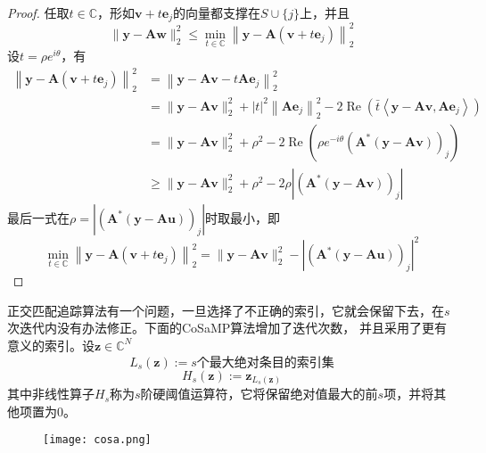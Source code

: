 \begin{proof}
任取$t \in \mathbb{C}$，形如$\mathbf{v}+t \mathbf{e}_j$的向量都支撑在$S \cup\{j\}$上，并且
\begin{equation}
    \|\mathbf{y}-\mathbf{A} \mathbf{w}\|_2^2 \leq \min _{t \in \mathbb{C}}\left\|\mathbf{y}-\mathbf{A}\left(\mathbf{v}+t \mathbf{e}_j\right)\right\|_2^2
\end{equation}
设$t=\rho e^{i \theta}$，有
\begin{equation}
    \begin{aligned}
    \left\|\mathbf{y}-\mathbf{A}\left(\mathbf{v}+t \mathbf{e}_j\right)\right\|_2^2 & =\left\|\mathbf{y}-\mathbf{A v}-t \mathbf{A} \mathbf{e}_j\right\|_2^2 \\
    & =\|\mathbf{y}-\mathbf{A v}\|_2^2+|t|^2\left\|\mathbf{A} \mathbf{e}_j\right\|_2^2-2 \operatorname{Re}\left(\bar{t}\left\langle\mathbf{y}-\mathbf{A v}, \mathbf{A} \mathbf{e}_j\right\rangle\right) \\
    & =\|\mathbf{y}-\mathbf{A v}\|_2^2+\rho^2-2 \operatorname{Re}\left(\rho e^{-i \theta}\left(\mathbf{A}^*(\mathbf{y}-\mathbf{A v})\right)_j\right) \\
    & \geq\|\mathbf{y}-\mathbf{A v}\|_2^2+\rho^2-2 \rho\left|\left(\mathbf{A}^*(\mathbf{y}-\mathbf{A} \mathbf{v})\right)_j\right|
    \end{aligned}
\end{equation}
最后一式在$\rho=\left|\left(\mathbf{A}^*(\mathbf{y}-\mathbf{A} \mathbf{u})\right)_j\right|$时取最小，即
\begin{equation}
    \min _{t \in \mathbb{C}}\left\|\mathbf{y}-\mathbf{A}\left(\mathbf{v}+t \mathbf{e}_j\right)\right\|_2^2=\|\mathbf{y}-\mathbf{A v}\|_2^2-\left|\left(\mathbf{A}^*(\mathbf{y}-\mathbf{A} \mathbf{u})\right)_j\right|^2
\end{equation}
\end{proof}
正交匹配追踪算法有一个问题，一旦选择了不正确的索引，它就会保留下去，在$s$次迭代内没有办法修正。下面的CoSaMP算法增加了迭代次数，
并且采用了更有意义的索引。设$\mathbf{z} \in \mathbb{C}^N$
\begin{equation}
    L_s(\mathbf{z}):=s\text{个最大绝对条目的索引集}
\end{equation}
\begin{equation}
    H_s(\mathbf{z}):=\mathbf{z}_{L_s(\mathbf{z})}
\end{equation}
其中非线性算子$H_s$称为$s$阶硬阈值运算符，它将保留绝对值最大的前$s$项，并将其他项置为0。\par
\begin{figure}[!htbp]
    \centering
    \texttt{[image: cosa.png]}
\end{figure}

